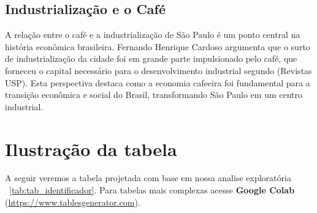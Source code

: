 \subsection{Industrialização e o Café}
\label{Industrialização e o Café}
A relação entre o café e a industrialização de São Paulo é um ponto central na história econômica brasileira. Fernando Henrique Cardoso argumenta que o surto de industrialização da cidade foi em grande parte impulsionado pelo café, que forneceu o capital necessário para o desenvolvimento industrial segundo    (Revistas USP). Esta perspectiva destaca como a economia cafeeira foi fundamental para a transição econômica e social do Brasil, transformando São Paulo em um centro industrial. 




\section{Ilustração da tabela}
\label{sec:tabela}
A seguir veremos a tabela projetada com base em nossa analise exploratória ~\ref{tab:tab_identificador}. Para tabelas mais complexas acesse \textbf{Google Colab} (\href{https://colab.research.google.com/drive/13pkQod1-j8R78SPn5xicTYek3q6nH9SP?usp=sharing%20}{https://www.tablesgenerator.com}).
